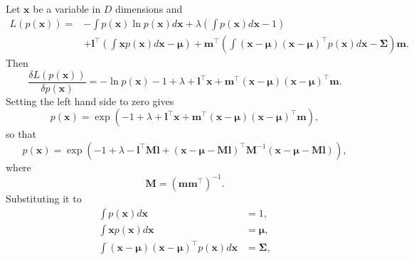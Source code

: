 \subsection{}
\label{2.14}
Let $\mathbf{x}$ be a variable in $D$ dimensions and 
%
\begin{equation}
\begin{aligned}
L(p(\mathbf{x})) = 
&
- 
\int 
p(\mathbf{x}) 
\ln p(\mathbf{x}) 
d\mathbf{x}
+ 
\lambda 
\left( 
	\int
	 p(\mathbf{x}) 
	 d\mathbf{x} 
	 - 
	 1 
\right) 
\\
&
+ 
\mathbf{l} ^ \intercal 
\left( 
	\int 
	\mathbf{x} 
	p(\mathbf{x}) 
	d\mathbf{x} 
	- 
	\bm{\mu} 
\right)
+ 
\mathbf{m} ^ \intercal 
\left( 
	\int 
	(\mathbf{x} - \bm{\mu}) 
	(\mathbf{x} - \bm{\mu}) ^ \intercal 
	p(\mathbf{x}) 
	d\mathbf{x} 
	- 
	\bm{\Sigma} 
\right) 
\mathbf{m}.
\end{aligned}
\end{equation}
%
Then
%
\begin{equation}
\frac{\delta L(p(\mathbf{x}))}{\delta p(\mathbf{x})} 
= 
- 
\ln p(\mathbf{x}) 
- 
1 
+ 
\lambda
+ 
\mathbf{l} ^ \intercal 
\mathbf{x} 
+ 
\mathbf{m} ^ \intercal 
(\mathbf{x} - \bm{\mu}) 
(\mathbf{x} - \bm{\mu}) ^ \intercal 
\mathbf{m}.
\end{equation}
%
Setting the left hand side to zero gives
%
\begin{equation}
p(\mathbf{x}) 
= 
\exp 
\left( 
	- 
	1 
	+ 
	\lambda
	+ 
	\mathbf{l} ^ \intercal 
	\mathbf{x} 
	+ 
	\mathbf{m} ^ \intercal 
	(\mathbf{x} - \bm{\mu}) 
	(\mathbf{x} - \bm{\mu}) ^ \intercal 
	\mathbf{m} 
\right),
\end{equation}
%
so that
%
\begin{equation}
p(\mathbf{x}) 
= 
\exp 
\left( 
	- 
	1 
	+ 
	\lambda
	- 
	\mathbf{l} ^ \intercal 
	\mathbf{M} \mathbf{l}
	+ 
	\left( 
		\mathbf{x} 
		- 
		\bm{\mu} 
		- 
		\mathbf{M} 
		\mathbf{l} 
	\right) ^ \intercal 
	\mathbf{M} ^ {- 1} 
	\left( 
		\mathbf{x} 
		- 
		\bm{\mu} 
		- 
		\mathbf{M} 
		\mathbf{l}
	\right)
\right),
\end{equation}
%
where
%
\begin{equation}
\mathbf{M} 
= 
\left( 
	\mathbf{m} 
	\mathbf{m} ^ \intercal 
\right) ^ {- 1}.
\end{equation}
%
Substituting it to 
%
\begin{equation}
\begin{aligned}
\int 
p(\mathbf{x}) 
d\mathbf{x} 
&= 
1, 
\\
\int 
\mathbf{x} 
p(\mathbf{x}) 
d\mathbf{x} 
&= 
\bm{\mu}, 
\\
\int 
(\mathbf{x} - \bm{\mu}) 
(\mathbf{x} - \bm{\mu}) ^ \intercal 
p(\mathbf{x}) 
d\mathbf{x} 
&= 
\bm{\Sigma},
\end{aligned}
\end{equation}

